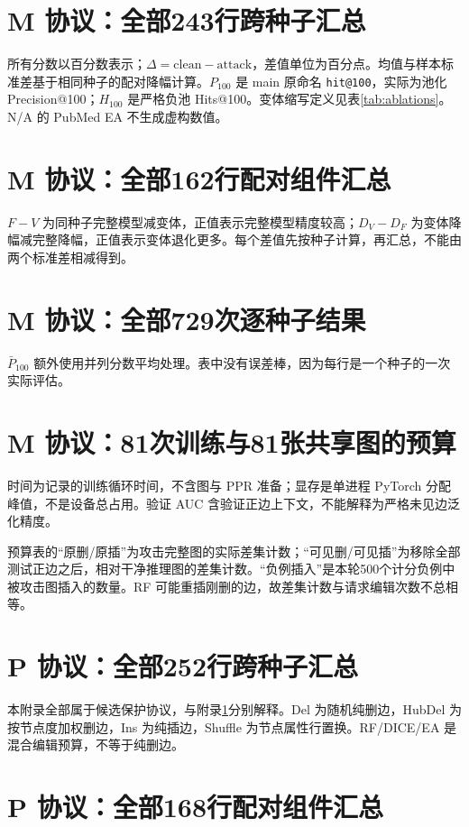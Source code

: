 \documentclass[UTF8,a4paper,11pt,fontset=fandol]{ctexart}
\newcommand{\code}[1]{{\small\nolinkurl{#1}}}
\begin{document}
\begin{landscape}
\begin{landscape}
\section{M 协议：全部243行跨种子汇总}\label{app:m}
所有分数以百分数表示；$\Delta=\mathrm{clean}-\mathrm{attack}$，差值单位为百分点。均值与样本标准差基于相同种子的配对降幅计算。$P_{100}$ 是 main 原命名 \code{hit@100}，实际为池化 Precision@100；$H_{100}$ 是严格负池 Hits@100。变体缩写定义见表\ref{tab:ablations}。N/A 的 PubMed EA 不生成虚构数值。

\clearpage\section{M 协议：全部162行配对组件汇总}
$F-V$ 为同种子完整模型减变体，正值表示完整模型精度较高；$D_V-D_F$ 为变体降幅减完整降幅，正值表示变体退化更多。每个差值先按种子计算，再汇总，不能由两个标准差相减得到。

\clearpage\section{M 协议：全部729次逐种子结果}
$\bar P_{100}$ 额外使用并列分数平均处理。表中没有误差棒，因为每行是一个种子的一次实际评估。

\clearpage\section{M 协议：81次训练与81张共享图的预算}
时间为记录的训练循环时间，不含图与 PPR 准备；显存是单进程 PyTorch 分配峰值，不是设备总占用。验证 AUC 含验证正边上下文，不能解释为严格未见边泛化精度。

预算表的“原删/原插”为攻击完整图的实际差集计数；“可见删/可见插”为移除全部测试正边之后，相对干净推理图的差集计数。“负例插入”是本轮500个计分负例中被攻击图插入的数量。RF 可能重插刚删的边，故差集计数与请求编辑次数不总相等。

\clearpage\section{P 协议：全部252行跨种子汇总}
本附录全部属于候选保护协议，与附录\ref{app:m}分别解释。Del 为随机纯删边，HubDel 为按节点度加权删边，Ins 为纯插边，Shuffle 为节点属性行置换。RF/DICE/EA 是混合编辑预算，不等于纯删边。

\clearpage\section{P 协议：全部168行配对组件汇总}


\end{landscape}
\end{landscape}
\end{document}
